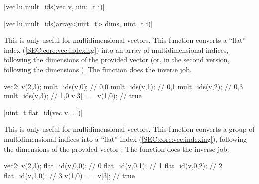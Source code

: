 \funcitem \cppinline|vec1u mult_ids(vec v, uint_t i)| 

\cppinline|vec1u mult_ids(array<uint_t> dims, uint_t i)|

This is only useful for multidimensional vectors. This function converts a ``flat'' index  (\ref{SEC:core:vec:indexing}) into an array of multidimensional indices, following the dimensions of the provided vector  (or, in the second version, following the dimensions ). The  function does the inverse job.

\begin{example}
\begin{cppcode}
vec2i v(2,3);
mult_ids(v,0); // {0,0}
mult_ids(v,1); // {0,1}
mult_ids(v,2); // {0,3}
mult_ids(v,3); // {1,0}
v[3] == v(1,0); // true
\end{cppcode}
\end{example}

\funcitem \cppinline|uint_t flat_id(vec v, ...)| 

This is only useful for multidimensional vectors. This function converts a group of multidimensional indices into a ``flat'' index (\ref{SEC:core:vec:indexing}), following the dimensions of the provided vector . The  function does the inverse job.

\begin{example}
\begin{cppcode}
vec2i v(2,3);
flat_id(v,0,0); // 0
flat_id(v,0,1); // 1
flat_id(v,0,2); // 2
flat_id(v,1,0); // 3
v(1,0) == v[3]; // true
\end{cppcode}
\end{example}
